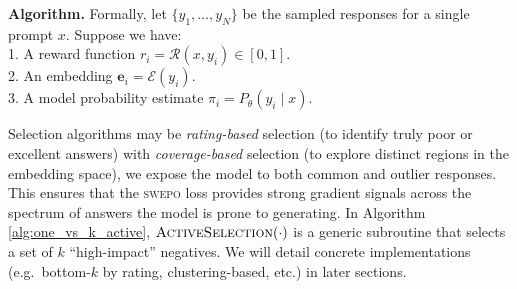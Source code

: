 \noindent
\textbf{Algorithm.}
Formally, let $\{y_1,\dots,y_N\}$ be the sampled responses for a single prompt $x$. Suppose we have:\\
1. A reward function $r_i = \mathcal{R}(x,y_i)\in [0,1]$.\\
2. An embedding $\mathbf{e}_i = \mathcal{E}(y_i)$.\\
3. A model probability estimate $\pi_i = P_\theta(y_i\mid x)$.

Selection algorithms may be \textit{rating-based} selection (to identify truly poor or excellent answers) with \textit{coverage-based} selection (to explore distinct regions in the embedding space), we expose the model to both common and outlier responses. This ensures that the \textsc{swepo} loss provides strong gradient signals across the spectrum of answers the model is prone to generating. In Algorithm \ref{alg:one_vs_k_active}, $\textsc{ActiveSelection}(\cdot)$ is a generic subroutine that selects a set of $k$ “high-impact” negatives. We will detail concrete implementations (e.g.\ bottom-$k$ by rating, clustering-based, etc.) in later sections.



